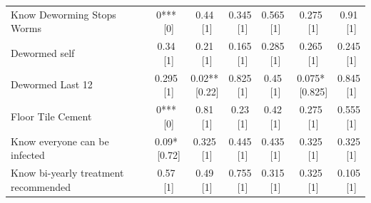 {\begin{tabular}[t]{lcccccc}
\addlinespace
Know Deworming Stops Worms & \makecell[c]{0***\\\ [0]} & \makecell[c]{0.44\\\ [1]} & \makecell[c]{0.345\\\ [1]} & \makecell[c]{0.565\\\ [1]} & \makecell[c]{0.275\\\ [1]} & \makecell[c]{0.91\\\ [1]}\\
Dewormed self & \makecell[c]{0.34\\\ [1]} & \makecell[c]{0.21\\\ [1]} & \makecell[c]{0.165\\\ [1]} & \makecell[c]{0.285\\\ [1]} & \makecell[c]{0.265\\\ [1]} & \makecell[c]{0.245\\\ [1]}\\
Dewormed Last 12 & \makecell[c]{0.295\\\ [1]} & \makecell[c]{0.02**\\\ [0.22]} & \makecell[c]{0.825\\\ [1]} & \makecell[c]{0.45\\\ [1]} & \makecell[c]{0.075*\\\ [0.825]} & \makecell[c]{0.845\\\ [1]}\\
Floor Tile Cement & \makecell[c]{0***\\\ [0]} & \makecell[c]{0.81\\\ [1]} & \makecell[c]{0.23\\\ [1]} & \makecell[c]{0.42\\\ [1]} & \makecell[c]{0.275\\\ [1]} & \makecell[c]{0.555\\\ [1]}\\
Know everyone can be infected & \makecell[c]{0.09*\\\ [0.72]} & \makecell[c]{0.325\\\ [1]} & \makecell[c]{0.445\\\ [1]} & \makecell[c]{0.435\\\ [1]} & \makecell[c]{0.325\\\ [1]} & \makecell[c]{0.325\\\ [1]}\\
\addlinespace
Know bi-yearly treatment recommended & \makecell[c]{0.57\\\ [1]} & \makecell[c]{0.49\\\ [1]} & \makecell[c]{0.755\\\ [1]} & \makecell[c]{0.315\\\ [1]} & \makecell[c]{0.325\\\ [1]} & \makecell[c]{0.105\\\ [1]}\\

\end{tabular}}
